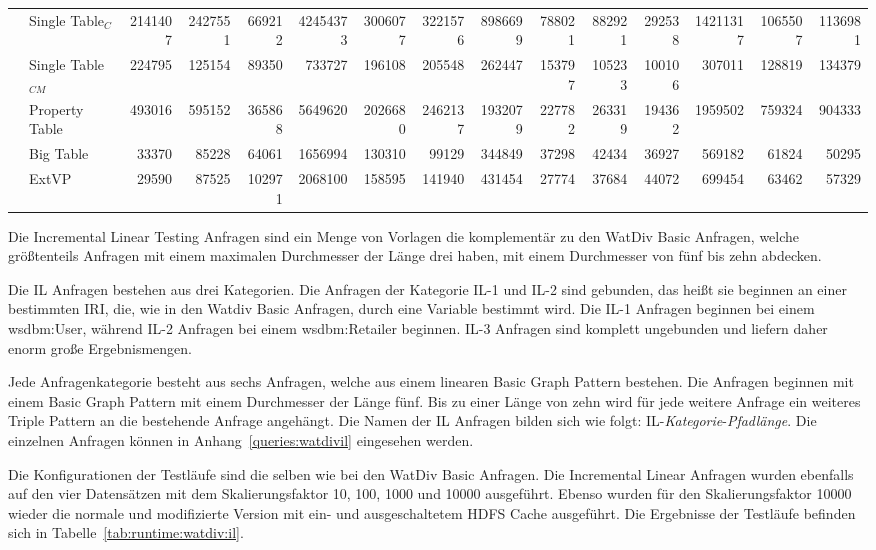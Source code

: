\documentclass[
  a4paper,
  12pt,
  oneside,
  parskip=half,
  headsepline,
]{scrartcl}
\begin{document}
\begin{table*}[htb]
\begin{tabular*}{\textwidth}{ ll @{\extracolsep{\fill}} rrrrrrrrrrrrr }
		& Single Table$_C$ & 2141407 & 2427551 & 669212 & 42454373 & 3006077 & 3221576 & 8986699 & 788021 & 882921 & 292538 & 14211317 & 1065507 & 1136981 \\
		& Single Table$_{CM}$ & 224795 & 125154 & 89350 & 733727 & 196108 & 205548 & 262447 & 153797 & 105233 & 100106 & 307011 & 128819 & 134379 \\
		& Property Table & 493016 & 595152 & 365868 & 5649620 & 2026680 & 2462137 & 1932079 & 227782 & 263319 & 194362 & 1959502 & 759324 & 904333 \\
		& Big Table & 33370 & 85228 & 64061 & 1656994 & 130310 & 99129 & 344849 & 37298 & 42434 & 36927 & 569182 & 61824 & 50295 \\
		& ExtVP & 29590 & 87525 & 102971 & 2068100 & 158595 & 141940 & 431454 & 27774 & 37684 & 44072 & 699454 & 63462 & 57329 \\
		\bottomrule
  	\end{tabular*}
\end{table*}
\setlength{\tabcolsep}{6pt}

Die Incremental Linear Testing Anfragen sind ein Menge von Vorlagen die
komplementär zu den WatDiv Basic Anfragen, welche größtenteils Anfragen mit
einem maximalen Durchmesser der Länge drei haben, mit einem Durchmesser
von fünf bis zehn abdecken.

Die IL Anfragen bestehen aus drei Kategorien. Die Anfragen der Kategorie IL-1
und IL-2 sind gebunden, das heißt sie beginnen an einer bestimmten IRI, die, wie
in den Watdiv Basic Anfragen, durch eine Variable  bestimmt wird. Die IL-1
Anfragen beginnen bei einem wsdbm:User, während IL-2  Anfragen bei einem
wsdbm:Retailer beginnen. IL-3 Anfragen sind komplett ungebunden und liefern
daher enorm große Ergebnismengen.

Jede Anfragenkategorie besteht aus sechs Anfragen, welche aus einem linearen
Basic Graph Pattern bestehen. Die Anfragen beginnen mit einem  Basic Graph
Pattern mit einem Durchmesser der Länge fünf. Bis zu einer Länge von zehn wird
für jede weitere Anfrage ein weiteres Triple Pattern an die bestehende
Anfrage angehängt. Die Namen der IL Anfragen bilden sich wie folgt:
IL-\textit{Kategorie}-\textit{Pfadlänge}. Die einzelnen Anfragen können in
Anhang~\ref{queries:watdivil} eingesehen werden.

Die Konfigurationen der Testläufe sind die selben wie bei den WatDiv Basic
Anfragen. Die Incremental Linear Anfragen wurden ebenfalls auf den vier
Datensätzen mit dem Skalierungsfaktor 10, 100, 1000 und 10000 ausgeführt. Ebenso
wurden für den Skalierungsfaktor 10000 wieder die normale und modifizierte
Version mit ein- und ausgeschaltetem HDFS Cache ausgeführt. Die Ergebnisse der
Testläufe befinden sich in Tabelle~\ref{tab:runtime:watdiv:il}.
\end{document}
